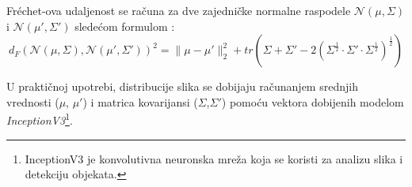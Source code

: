 \documentclass[12pt,oneside]{memoir}
\begin{document}
Fréchet-ova udaljenost se računa za dve zajedničke normalne raspodele \(\mathcal{N}(\mu,\Sigma)\) i \(\mathcal{N}(\mu',\Sigma')\) sledećom formulom \cite{dowson1982frechet}:
\begin{equation}
    d_{F}(\mathcal N(\mu, \Sigma), \mathcal N(\mu', \Sigma'))^2 =
        \| \mu - \mu' \|^{2}_{2} + 
        tr\left(\Sigma + \Sigma' -
        2\left(\Sigma^\frac{1}{2} \cdot \Sigma' \cdot \Sigma^\frac{1}{2} \right)^\frac{1}{2} \right)
\end{equation}

U praktičnoj upotrebi, distribucije slika se dobijaju računanjem srednjih vrednosti (\(\mu\), \(\mu'\)) i matrica kovarijansi (\(\Sigma\),\(\Sigma'\)) pomoću vektora dobijenih modelom \textit{InceptionV3}\footnote{InceptionV3 je konvolutivna neuronska mreža koja se koristi za analizu slika i detekciju objekata.}.




\end{document}

